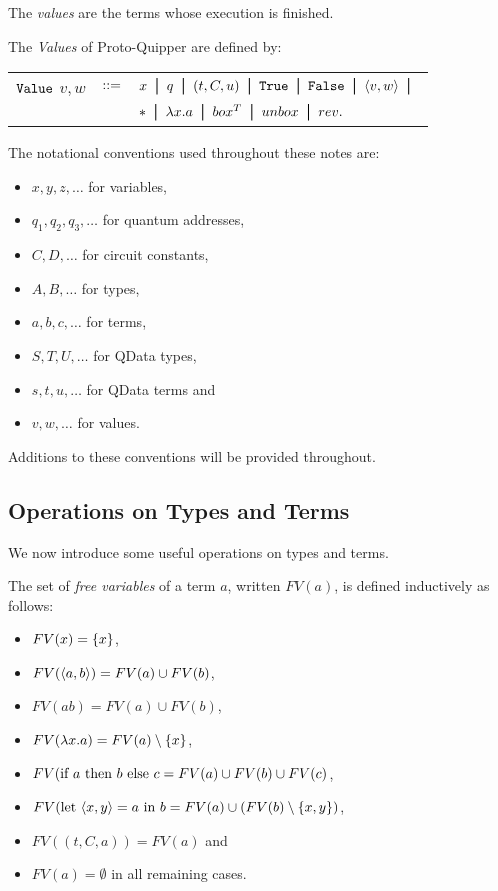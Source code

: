 \documentclass{article}
\begin{document}
The \emph{values} are the terms whose execution is finished.

\begin{definition}
The \emph{Values} of Proto-Quipper are defined by:
\begin{center}
\begin{tabular}{rcl}
$\texttt{Value}$ $v,w$ & $::=$ & $x \bor q \bor (t,C,u) \bor \true \bor 
  \false \bor \p{v,w} \bor$ \\
& & $* \bor \lambda x.a  \bor box^T \bor unbox \bor rev.$
\end{tabular}
\end{center}
\end{definition}

The notational conventions used throughout these notes are:
\begin{itemize}
  \item $x,y,z,\ldots$ for variables,
  \item $q_1,q_2,q_3,\ldots$ for quantum addresses,
  \item $C,D,\ldots$ for circuit constants,
  \item $A,B,\ldots$ for types,
  \item $a,b,c,\ldots$ for terms,
  \item $S,T,U,\ldots$ for QData types,
  \item $s,t,u,\ldots$ for QData terms and
  \item $v,w,\ldots$ for values.
\end{itemize}
Additions to these conventions will be provided throughout.


\subsection{Operations on Types and Terms}

We now introduce some useful operations on types and terms. 

\begin{definition}
The set of \emph{free variables} of a term $a$, written $FV(a)$, 
is defined inductively as follows:
\begin{itemize}
  \item $FV(x)=\{x\}$,
  \item $FV(\langle a,b\rangle)=FV(a)\cup FV(b)$,
  \item $FV(ab)=FV(a)\cup FV(b)$,
  \item $FV(\lambda x.a)=FV(a)\setminus\{x\}$,
  \item $FV(\text{if}~ a ~\text{then}~ b ~\text{else}~ c = FV(a) \cup FV(b) \cup FV(c)$,
  \item $FV(\text{let}~ \langle x,y\rangle = a ~\text{in}~ b= FV(a)\cup (FV(b)\setminus \{x,y\})$,
  \item $FV((t,C,a))= FV(a)$ and
  \item $FV(a)=\emptyset$ in all remaining cases.
\end{itemize}
\end{definition}
\end{document}
